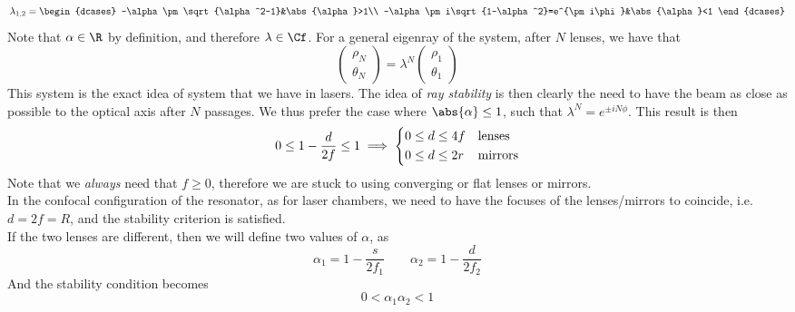 \documentclass[../electromagnetism.tex]{subfiles}
\begin{document}
\begin{equation}
	\lambda_{1,2}=\begin{dcases}
		-\alpha\pm\sqrt{\alpha^2-1}&\abs{\alpha}>1\\
		-\alpha\pm i\sqrt{1-\alpha^2}=e^{\pm i\phi}&\abs{\alpha}<1
	\end{dcases}
	\label{eq:eigenvalues.pr}
\end{equation}
Note that $\alpha\in\R$ by definition, and therefore $\lambda\in\Cf$. For a general eigenray of the system, after $N$ lenses, we have that
\begin{equation}
	\begin{pmatrix}
		\rho_N\\\theta_N
	\end{pmatrix}=\lambda^N\begin{pmatrix}
		\rho_1\\\theta_1
	\end{pmatrix}
	\label{eq:eigenray.pr}
\end{equation}
This system is the exact idea of system that we have in lasers. The idea of \textit{ray stability} is then clearly the need to have the beam as close as possible to the optical axis after $N$ passages. We thus prefer the case where $\abs{\alpha}\le1$, such that $\lambda^N=e^{\pm iN\phi}$. This result is then
\begin{equation}
	0\le1-\frac{d}{2f}\le1\implies\begin{dcases}
		0\le d\le4f&\text{lenses}\\
		0\le d\le2r&\text{mirrors}
	\end{dcases}
	\label{eq:stability.pr}
\end{equation}
Note that we \textit{always} need that $f\ge0$, therefore we are stuck to using converging or flat lenses or mirrors.\\
In the confocal configuration of the resonator, as for laser chambers, we need to have the focuses of the lenses/mirrors to coincide, i.e. $d=2f=R$, and the stability criterion is satisfied.\\
If the two lenses are different, then we will define two values of $\alpha$, as
\begin{equation*}
	\alpha_1=1-\frac{s}{2f_1}\qquad\alpha_2=1-\frac{d}{2f_2}
\end{equation*}
And the stability condition becomes
\begin{equation}
	0<\alpha_1\alpha_2<1
	\label{eq:differentstab.pr}
\end{equation}
\end{document}

